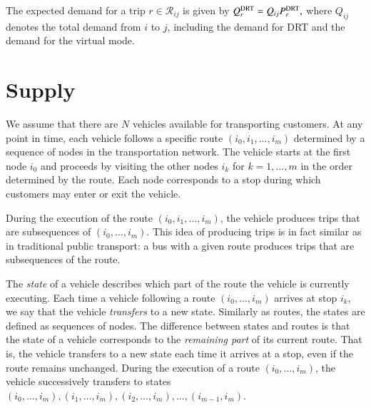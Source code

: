 \documentclass[dissertation,draft*]{aaltoseries}
\begin{document}
The expected demand for a trip $r \in \mathcal{R}_{ij}$ is given by
$Q_{r}^{\rm DRT} = Q_{ij} P_{r}^{\rm DRT},$
where $Q_{ij}$ denotes the total demand from $i$ to $j$, including the demand for DRT and the demand for the virtual mode.

\section{Supply}
\label{vehiclemovements}
We assume that there are $N$ vehicles available for transporting customers. 
At any point in time, each vehicle follows a specific route $(i_0,i_1,\ldots,i_m)$ 
determined by a sequence of nodes in the transportation network.
The vehicle starts at the first node $i_0$ and proceeds by visiting the other nodes $i_k$
for $k=1,\ldots,m$ in the order determined by the route.
Each node corresponds to a stop during which customers may enter or exit the vehicle.

During the execution of the route $(i_0,i_1,\ldots,i_m)$, the vehicle produces
trips that are subsequences of $(i_0,\ldots, i_m)$. This idea of producing trips 
is in fact similar as in traditional public transport: a bus with a given route 
produces trips that are subsequences of the route.

The \emph{state} of a vehicle describes which part of the route the vehicle is currently executing.
Each time a vehicle following a route $(i_0,\ldots,i_m)$ arrives at stop $i_k$, 
we say that the vehicle \emph{transfers} to a new state.
Similarly as routes, the states are defined as sequences of nodes.
The difference between states and routes
is that the state of a vehicle corresponds to the \emph{remaining part} of its current route. 
That is, the vehicle transfers to a new state each time it arrives at a stop, even if the route remains unchanged.
During the execution of a route $(i_0,\ldots,i_m)$, the vehicle successively transfers to states 
$(i_0,\ldots,i_m),(i_1,\ldots,i_m),(i_2,\ldots,i_m),\ldots,(i_{m-1},i_m)$.
\end{document}
